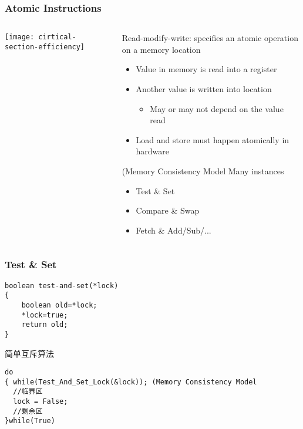\begin{frame}[plain]	
	\frametitle{Atomic Instructions}
	
	
	\begin{columns}
		
		\begin{column}{.4\textwidth}
			\texttt{[image: cirtical-section-efficiency]}
		\end{column}
		\begin{column}{.6\textwidth}
			Read-modify-write: specifies an atomic operation on a memory location
			
			\begin{itemize}
				\item Value in memory is read into a register
				\item Another value is written into location
				\begin{itemize}
					\item May or may not depend on the value read
				\end{itemize}
				\item Load and store must happen atomically in hardware
					
			\end{itemize}		
			(Memory Consistency Model
			Many instances
			\begin{itemize}
				\item  Test \& Set
				\item Compare  \&  Swap
				\item Fetch  \& Add/Sub/...				
				
			\end{itemize}		
		\end{column}
	\end{columns}
	
\end{frame}


\begin{frame}[fragile]
	\frametitle{Test \& Set}
	
\begin{lstlisting}
boolean test-and-set(*lock)
{
    boolean old=*lock;
    *lock=true;
    return old;
}
\end{lstlisting}
简单互斥算法
\begin{lstlisting}
do
{ while(Test_And_Set_Lock(&lock)); (Memory Consistency Model
  //临界区
  lock = False;
  //剩余区
}while(True)
\end{lstlisting}
\end{frame}
	
